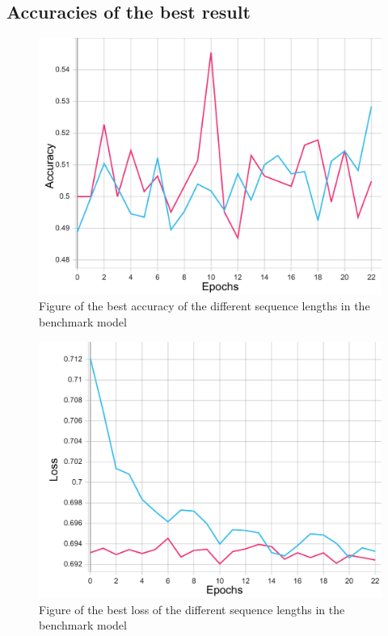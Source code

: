\subsection{Accuracies of the best result}

\begin{figure}[ht]
    \centering
    \includegraphics[width=0.95\columnwidth]{figures/results/benchmark/benchmark_quarter_acc.pdf}
    \caption[Best accuracy for the benchmark model]{Figure of the best accuracy of the different sequence lengths in the benchmark model}
    \label{fig:benchmark_best_accuracy}
\end{figure}
\FloatBarrier

\begin{figure}[ht]
    \centering
    \includegraphics[width=0.95\columnwidth]{figures/results/benchmark/benchmark_quarter_loss.pdf}
    \caption[Best loss for the benchmark model]{Figure of the best loss of the different sequence lengths in the benchmark model}
    \label{fig:benchmark_best_loss}
\end{figure}
\FloatBarrier

